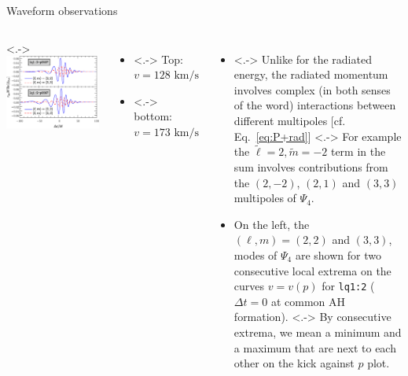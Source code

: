 \documentclass[smaller,aspectratio=169]{beamer}
\newcommand{\tl}{\tilde{\ell}}
\newcommand{\tm}{\tilde{m}}
\begin{document}
\begin{frame}{Waveform observations}
	\begin{columns}
			\only<.->{
				\centering
				\includegraphics[width=\columnwidth]{mode-kick-extrema.eps}
			}
			\vspace{-1.5em}
			\begin{itemize}
 				\item<.-> Top: $v=128\text{ km/s}$
 				\item<.-> bottom: $v=173\text{ km/s}$
	 		\end{itemize}
			\begin{itemize}
				\item<.->
					Unlike for the radiated energy, the radiated momentum
					involves complex (in both senses of the word) 
					\alert{interactions} between different multipoles
					[cf. Eq.~\eqref{eq:P+rad}]
                \note[item]<.->{
                    For example the $\tl=2,\tm=-2$ term in the sum involves
                    contributions from the $(2,-2)$, $(2,1)$ and $(3,3)$
                    multipoles of $\Psi_4$.}
				\item<+->
					On the left, the $(\ell,m)=(2,2)$ and $(3,3)$, 
					modes of $\Psi_4$ are shown for two \alert{consecutive} 
					local extrema on the
					curves $v=v(p)$ for \texttt{lq1:2} ($\Delta t=0$ at common 
					AH formation).
                \note[item]<.->{
                    By consecutive extrema, we mean a minimum and a maximum
                    that are next to each other on the kick against $p$ plot.}

\end{itemize}
\end{columns}
\end{frame}
\end{document}
